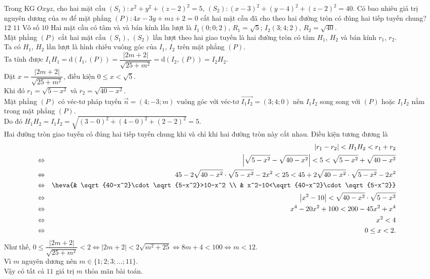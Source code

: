 \begin{ex}%
	Trong KG $Oxyz$, cho hai mặt cầu $(S_1)\colon x^2+y^2+(z-2)^2=5$, $(S_2)\colon (x-3)^2+(y-4)^2+(z-2)^2=40$. Có bao nhiêu giá trị nguyên dương của $m$ để mặt phẳng $(P)\colon 4x-3y+mz+2=0$ cắt hai mặt cầu đã cho theo hai đường tròn có đúng hai tiếp tuyến chung?
	\choice
	{$12$}
	{\True $11$}
	{Vô số}
	{$10$}
	\loigiai
	{Hai mặt cầu có tâm và và bán kính lần lượt là $I_1(0;0;2)$, $R_1=\sqrt{5}$; $I_2(3;4;2)$, $R_2=\sqrt{40}$.\\
	Mặt phẳng $(P)$ cắt hai mặt cầu $(S_1)$, $(S_2)$ lần lượt theo hai giao tuyến là hai đường tròn có tâm $H_1$, $H_2$ và bán kính $r_1$, $r_2$.\\
	Ta có $H_1$, $H_2$ lần lượt là hình chiếu vuông góc của $I_1$, $I_2$ trên mặt phẳng $(P)$.\\
	Ta tính được $I_1H_1=\mathrm{d}\left(I_1,(P)\right)=\dfrac{|2m+2|}{\sqrt{25+m^2}}=\mathrm{d}\left(I_2,(P)\right)=I_2H_2$.\\
	Đặt $x=\dfrac{|2m+2|}{\sqrt{25+m^2}}$, điều kiện $0\leq x<\sqrt{5}$.\\
	Khi đó $r_1=\sqrt{5-x^2}$ và $r_2=\sqrt{40-x^2}$.\\
	Mặt phẳng $(P)$ có véc-tơ pháp tuyến $\overrightarrow{n}=(4;-3;m)$ vuông góc với véc-tơ $\overrightarrow{I_1 I_2}=(3;4;0)$ nên $I_1I_2$ song song với $(P)$ hoặc $I_1I_2$ nằm trong mặt phẳng $(P)$.\\
	Do đó $H_1H_2=I_1I_2=\sqrt{(3-0)^2+(4-0)^2+(2-2)^2}=5$.\\
	Hai đường tròn giao tuyến có đúng hai tiếp tuyến chung khi và chỉ khi hai đường tròn này cắt nhau. Điều kiện tương đương là \allowdisplaybreaks\begin{eqnarray*}
	&&\left|r_1-r_2\right|<H_1H_2<r_1+r_2\\
	&\Leftrightarrow & \left|\sqrt{5-x^2}-\sqrt{40-x^2}\right|<5<\sqrt{5-x^2}+\sqrt{40-x^2}\\
	&\Leftrightarrow & 45-2\sqrt{40-x^2}\cdot\sqrt{5-x^2}-2x^2<25<45+2\sqrt{40-x^2}\cdot\sqrt{5-x^2}-2x^2\\
	&\Leftrightarrow &\heva{& \sqrt{40-x^2}\cdot\sqrt{5-x^2}>10-x^2 \\ & x^2-10<\sqrt{40-x^2}\cdot\sqrt{5-x^2}}\\
	&\Leftrightarrow & \left|x^2-10\right|<\sqrt{40-x^2}\cdot\sqrt{5-x^2}\\
	&\Leftrightarrow & x^4-20x^2+100<200-45x^2+x^4\\
	&\Leftrightarrow & x^2<4\\
	&\Leftrightarrow & 0\leq x<2.
	\end{eqnarray*}
	Như thế, $0\leq \dfrac{|2m+2|}{\sqrt{25+m^2}}<2\Leftrightarrow |2m+2|<2\sqrt{m^2+25}\Leftrightarrow 8m+4<100\Leftrightarrow m<12$.\\
	Vì $m$ nguyên dương nên $m\in\{1;2;3;\ldots;11\}$.\\
	Vậy có tất cả $11$ giá trị $m$ thỏa mãn bài toán.
	}
\end{ex}

